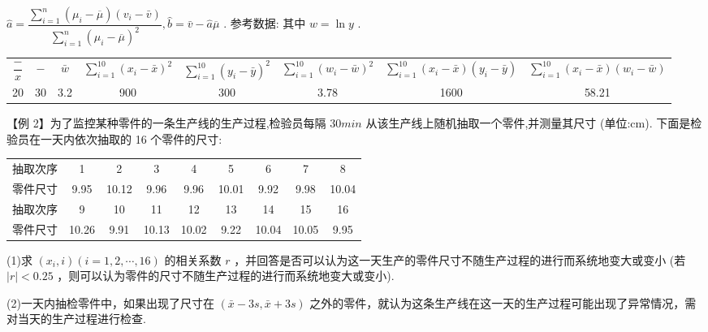 $\widehat{a} = \dfrac{\mathop{\sum }\limits_{{i = 1}}^{n}\left( {{\mu }_{i} - \overline{\mu }}\right) \left( {{v}_{i} - \bar{v}}\right) }{\mathop{\sum }\limits_{{i = 1}}^{n}{\left( {\mu }_{i} - \overline{\mu }\right) }^{2}},\widehat{b} = \bar{v} - \widehat{a}\overline{\mu }$ . 参考数据: 其中 $w = \ln y$ .

\begin{center}
\begin{tabular}{|c|c|c|c|c|c|c|c|}
\hline
$\dfrac{ - }{x}$ & − & $\bar{w}$ & $\mathop{\sum }\limits_{{i = 1}}^{{10}}{\left( {x}_{i} - \bar{x}\right) }^{2}$ & $\mathop{\sum }\limits_{{i = 1}}^{{10}}{\left( {y}_{i} - \bar{y}\right) }^{2}$ & $\mathop{\sum }\limits_{{i = 1}}^{{10}}{\left( {w}_{i} - \bar{w}\right) }^{2}$ & $\mathop{\sum }\limits_{{i = 1}}^{{10}}\left( {{x}_{i} - \bar{x}}\right) \left( {{y}_{i} - \bar{y}}\right)$ & $\mathop{\sum }\limits_{{i = 1}}^{{10}}\left( {{x}_{i} - \bar{x}}\right) \left( {{w}_{i} - \bar{w}}\right)$ \\
\cline{1-8}
20 & 30 & 3.2 & 900 & 300 & 3.78 & 1600 & 58.21 \\
\cline{1-8}
\hline
\end{tabular}
\end{center}

【例 2】为了监控某种零件的一条生产线的生产过程,检验员每隔 ${30}{{min}}$ 从该生产线上随机抽取一个零件,并测量其尺寸 (单位:cm). 下面是检验员在一天内依次抽取的 16 个零件的尺寸:

\begin{center}
\begin{tabular}{|c|c|c|c|c|c|c|c|c|}
\hline
抽取次序 & 1 & 2 & 3 & 4 & 5 & 6 & 7 & 8 \\
\cline{1-9}
零件尺寸 & 9.95 & 10.12 & 9.96 & 9.96 & 10.01 & 9.92 & 9.98 & 10.04 \\
\cline{1-9}
抽取次序 & 9 & 10 & 11 & 12 & 13 & 14 & 15 & 16 \\
\cline{1-9}
零件尺寸 & 10.26 & 9.91 & 10.13 & 10.02 & 9.22 & 10.04 & 10.05 & 9.95 \\
\cline{1-9}
\hline
\end{tabular}
\end{center}

(1)求 $\left( {{x}_{i},i}\right) \left( {i = 1,2,\cdots ,{16}}\right)$ 的相关系数 $r$ ，并回答是否可以认为这一天生产的零件尺寸不随生产过程的进行而系统地变大或变小 (若 $\left| r\right|  < {0.25}$ ，则可以认为零件的尺寸不随生产过程的进行而系统地变大或变小).

(2)一天内抽检零件中，如果出现了尺寸在 $\left( {\bar{x} - {3s},\bar{x} + {3s}}\right)$ 之外的零件，就认为这条生产线在这一天的生产过程可能出现了异常情况，需对当天的生产过程进行检查.

